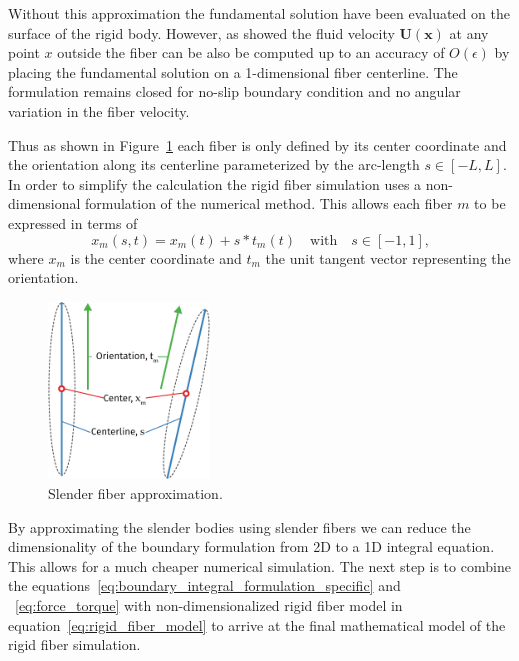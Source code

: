 \documentclass[a4paper,11pt]{kth-mag}
\begin{document}
Without this approximation the fundamental solution have been evaluated on the surface of the rigid body. However, as \cite{} showed the fluid velocity $\mathbf{U}(\mathbf{x})$ at any point $x$ outside the fiber can be also be computed up to an accuracy of $O(\epsilon)$ by placing the fundamental solution on a 1-dimensional fiber centerline. The formulation remains closed for no-slip boundary condition and no angular variation in the fiber velocity.

Thus as shown in Figure~\ref{fig:slender_fiber} each fiber is only defined by its center coordinate and the orientation along its centerline parameterized by the arc-length $s \in [-L, L]$. In order to simplify the calculation the rigid fiber simulation uses a non-dimensional formulation of the numerical method. This allows each fiber $m$ to be expressed in terms of
\begin{equation}
  \label{eq:rigid_fiber_model}
  x_m(s,t) = x_m(t) + s * t_m(t) \quad \text{with} \quad s \in [-1, 1] \text{,}
\end{equation}
where $x_m$ is the center coordinate and $t_m$ the unit tangent vector representing the orientation.

\begin{figure}[!htbp]
  \centering
  \includegraphics[width=0.3819660112501450000000\textwidth]{img/slender.pdf}
  \caption{Slender fiber approximation.}
  \label{fig:slender_fiber}
\end{figure}

By approximating the slender bodies using slender fibers we can reduce the dimensionality of the boundary formulation from 2D to a 1D integral equation. This allows for a much cheaper numerical simulation. The next step is to combine the equations~\eqref{eq:boundary_integral_formulation_specific} and ~\eqref{eq:force_torque} with non-dimensionalized rigid fiber model in equation~\eqref{eq:rigid_fiber_model} to arrive at the final mathematical model of the rigid fiber simulation.
\end{document}
